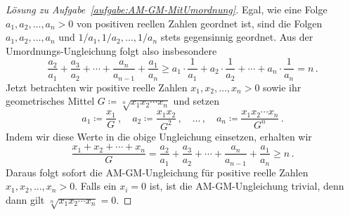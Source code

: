 \begin{proof}[Lösung zu Aufgabe~\ref{aufgabe:AM-GM-MitUmordnung}]
	 Egal, wie eine Folge $a_1,a_2,\dotsc,a_n>0$ von positiven reellen Zahlen geordnet ist, sind die Folgen $a_1,a_2,\dotsc,a_n$ und $1/a_1,1/a_2,\dotsc,1/a_n$ stets gegensinnig geordnet. Aus der Umordnungs-Ungleichung folgt also insbesondere
	\begin{equation*}
		\frac{a_2}{a_1}+\frac{a_3}{a_2}+\dotsb+\frac{a_n}{a_{n-1}}+\frac{a_1}{a_n}\geqslant a_1\cdot \frac{1}{a_1}+a_2\cdot \frac1{a_2}+\dotsb+a_n\cdot \frac{1}{a_n}= n\,.
	\end{equation*}
	Jetzt betrachten wir positive reelle Zahlen $x_1,x_2,\dotsc,x_n>0$ sowie ihr geometrisches Mittel $G\coloneqq \sqrt[n]{x_1x_2\dotsm x_n}$ und setzen
	\begin{equation*}
		a_1\coloneqq \frac{x_1}{G}\,,\quad a_2\coloneqq \frac{x_1x_2}{G^2}\,,\quad\dotsc\,,\quad a_n\coloneqq \frac{x_1x_2\dotsm x_n}{G^n}\,.
	\end{equation*}
	Indem wir diese Werte in die obige Ungleichung einsetzen, erhalten wir
	\begin{equation*}
		\frac{x_1+x_2+\dotsb+x_n}{G}=\frac{a_2}{a_1}+\frac{a_3}{a_2}+\dotsb+\frac{a_n}{a_{n-1}}+\frac{a_1}{a_n}\geqslant n\,.
	\end{equation*}
	Daraus folgt sofort die AM-GM-Ungleichung für positive reelle Zahlen $x_1,x_2,\dotsc,x_n>0$. Falls ein $x_i=0$ ist, ist die AM-GM-Ungleichung trivial, denn dann gilt $\sqrt[n]{x_1x_2\dotsm x_n}=0$.
\end{proof}